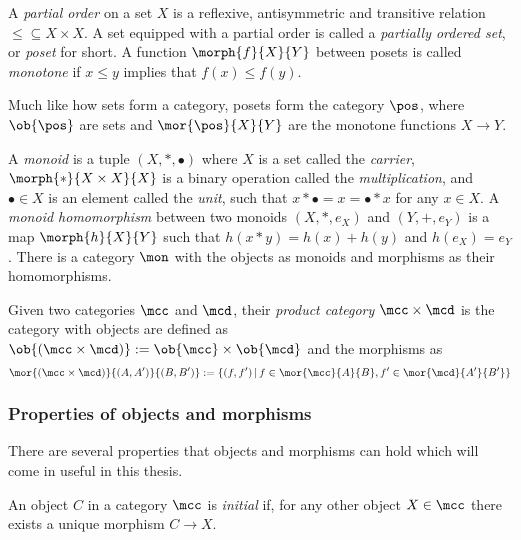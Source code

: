 \begin{example}[Posets]
    A \emph{partial order} on a set \(X\) is a reflexive, antisymmetric and
    transitive relation \(\leq \subseteq X \times X\).
    A set equipped with a partial order is called a
    \emph{partially ordered set}, or \emph{poset} for short.
    A function \(\morph{f}{X}{Y}\) between posets is called \emph{monotone} if
    \(x \leq y\) implies that \(f(x) \leq f(y)\).

    Much like how sets form a category, posets form the category \(\pos\), where
    \(\ob{\pos}\) are sets and \(\mor{\pos}{X}{Y}\) are the monotone functions
    \(X \to Y\).
\end{example}

\begin{example}[Monoids]
    A \emph{monoid} is a tuple \((X, *, \bullet)\) where \(X\) is a set called
    the \emph{carrier}, \(\morph{*}{X \times X}{X}\) is a binary operation
    called the \emph{multiplication}, and \(\bullet \in X\) is an element called
    the \emph{unit}, such that \(x * \bullet = x = \bullet * x\) for any
    \(x \in X\).
    A \emph{monoid homomorphism} between two monoids \((X, *, e_X)\) and
    \((Y, +, e_Y)\) is a map \(\morph{h}{X}{Y}\) such that
    \(h(x * y) = h(x) + h(y)\) and \(h(e_X) = e_Y\).
    There is a category \(\mon\) with the objects as monoids and morphisms as
    their homomorphisms.
\end{example}

\begin{example}
    Given two categories \(\mcc\) and \(\mcd\), their \emph{product category}
    \(\mcc \times \mcd\) is the category with objects are defined as \(
        \ob{(\mcc \times \mcd)} := \ob{\mcc} \times \ob{\mcd}
    \) and the morphisms as \[
        \mor{(\mcc \times \mcd)}{(A, A^\prime)}{(B, B^\prime)}
        :=
        \{
            (f, f^\prime)
            \,|\,
            f \in \mor{\mcc}{A}{B},
            f^\prime \in \mor{\mcd}{A^\prime}{B^\prime}
        \}
    \]
\end{example}

\subsubsection{Properties of objects and morphisms}

There are several properties that objects and morphisms can hold which will come
in useful in this thesis.

\begin{definition}
    An object \(C\) in a category \(\mcc\) is \emph{initial} if, for any other
    object \(X \in \mcc\) there exists a unique morphism \(C \to X\).
\end{definition}

